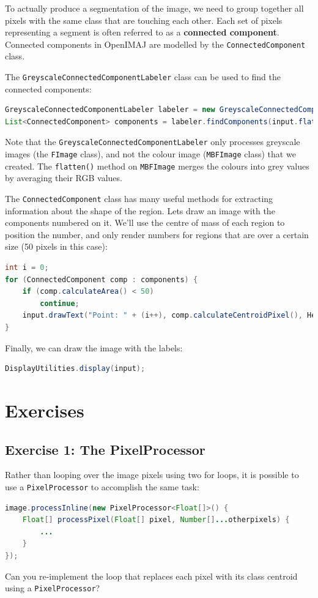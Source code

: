 \documentclass[10pt,a4paper,twoside,extrafontsizes]{memoir}
\begin{document}
To actually produce a segmentation of the image, we need to group together all pixels with 
the same class that are touching each other. Each set of pixels representing a segment is 
often referred to as a \textbf{connected component}. Connected components in OpenIMAJ are
modelled by the \verb+ConnectedComponent+ class.

The \verb+GreyscaleConnectedComponentLabeler+ class can be used to find the connected components:
\begin{lstlisting}[language=java]
GreyscaleConnectedComponentLabeler labeler = new GreyscaleConnectedComponentLabeler();
List<ConnectedComponent> components = labeler.findComponents(input.flatten());
\end{lstlisting}
Note that the \verb+GreyscaleConnectedComponentLabeler+ 
only processes greyscale images 
(the \verb+FImage+ class), and not the colour image (\verb+MBFImage+ class) that we created. 
The \verb+flatten()+ method on \verb+MBFImage+ merges the colours into grey values by 
averaging their RGB values.

The \verb+ConnectedComponent+ class has many useful methods for extracting information 
about the shape of the region. Lets draw an image with the components numbered on it. We'll use the 
centre of mass of each region to position the number, and only render numbers for regions that 
are over a certain size (50 pixels in this case):
\begin{lstlisting}[language=java]
int i = 0;
for (ConnectedComponent comp : components) {
    if (comp.calculateArea() < 50) 
        continue;
    input.drawText("Point: " + (i++), comp.calculateCentroidPixel(), HersheyFont.TIMES_MEDIUM,20);
}
\end{lstlisting}
Finally, we can draw the image with the labels:
\begin{lstlisting}[language=java]
DisplayUtilities.display(input);
\end{lstlisting}

\pagebreak
\section*{Exercises}
\subsection*{Exercise 1: The PixelProcessor}
Rather than looping over the image pixels using two for loops, it is possible to use a 
\verb+PixelProcessor+ to accomplish the same task:
\begin{lstlisting}[language=java]
image.processInline(new PixelProcessor<Float[]>() {
    Float[] processPixel(Float[] pixel, Number[]...otherpixels) {
        ...
    }
});
\end{lstlisting}
Can you re-implement the loop that replaces each pixel with its class centroid 
using a \verb+PixelProcessor+? 
\end{document}
